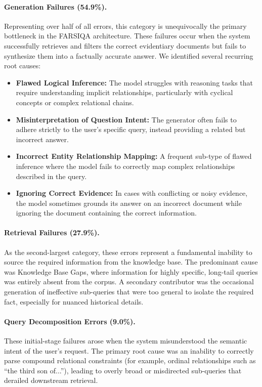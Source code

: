 \documentclass[11pt]{article}
\begin{document}
\paragraph{Generation Failures (54.9\%).} Representing over half of all errors, this category is unequivocally the primary bottleneck in the FARSIQA architecture. These failures occur when the system successfully retrieves and filters the correct evidentiary documents but fails to synthesize them into a factually accurate answer. We identified several recurring root causes:

\begin{itemize}
\item \textbf{Flawed Logical Inference:} The model struggles with reasoning tasks that require understanding implicit relationships, particularly with cyclical concepts or complex relational chains.
\item \textbf{Misinterpretation of Question Intent:} The generator often fails to adhere strictly to the user's specific query, instead providing a related but incorrect answer.
\item \textbf{Incorrect Entity Relationship Mapping:} A frequent sub-type of flawed inference where the model fails to correctly map complex relationships described in the query.
\item \textbf{Ignoring Correct Evidence:} In cases with conflicting or noisy evidence, the model sometimes grounds its answer on an incorrect document while ignoring the document containing the correct information.
\end{itemize}

\paragraph{Retrieval Failures (27.9\%).} As the second-largest category, these errors represent a fundamental inability to source the required information from the knowledge base. The predominant cause was Knowledge Base Gaps, where information for highly specific, long-tail queries was entirely absent from the corpus. A secondary contributor was the occasional generation of ineffective sub-queries that were too general to isolate the required fact, especially for nuanced historical details.

\paragraph{Query Decomposition Errors (9.0\%).} These initial-stage failures arose when the system misunderstood the semantic intent of the user's request. The primary root cause was an inability to correctly parse compound relational constraints (for example, ordinal relationships such as ``the third son of...''), leading to overly broad or misdirected sub-queries that derailed downstream retrieval.
\end{document}

